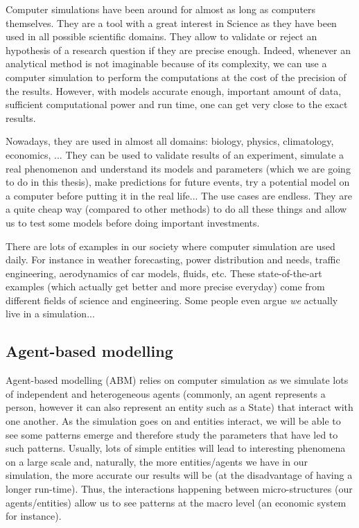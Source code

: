     Computer simulations have been around for almost as long as computers themselves. They are a tool with a great interest in Science as they have been used in all possible scientific domains. They allow to validate or reject an hypothesis of a research question if they are precise enough. Indeed, whenever an analytical method is not imaginable because of its complexity, we can use a computer simulation to perform the computations at the cost of the precision of the results. However, with models accurate enough, important amount of data, sufficient computational power and run time, one can get very close to the exact results. \cite{exprimentationNumeriqueParOrdinateur}

    Nowadays, they are used in almost all domains: biology, physics, climatology, economics, ... They can be used to validate results of an experiment, simulate a real phenomenon and understand its models and parameters (which we are going to do in this thesis), make predictions for future events, try a potential model on a computer before putting it in the real life... The use cases are endless. They are a quite cheap way (compared to other methods) to do all these things and allow us to test some models before doing important investments.

    There are lots of examples in our society where computer simulation are used daily. For instance in weather forecasting, power distribution and needs, traffic engineering, aerodynamics of car models, fluids, etc. These state-of-the-art examples (which actually get better and more precise everyday) come from different fields of science and engineering. \cite{weatherForecasting} Some people even argue \emph{we} actually live in a simulation...

    \subsection{Agent-based modelling}
    Agent-based modelling (ABM) relies on computer simulation as we simulate lots of independent and heterogeneous agents (commonly, an agent represents a person, however it can also represent an entity such as a State) that interact with one another. As the simulation goes on and entities interact, we will be able to see some patterns emerge and therefore study the parameters that have led to such patterns. Usually, lots of simple entities will lead to interesting phenomena on a large scale and, naturally, the more entities/agents we have in our simulation, the more accurate our results will be (at the disadvantage of having a longer run-time). Thus, the interactions happening between micro-structures (our agents/entities) allow us to see patterns at the macro level (an economic system for instance).
    
